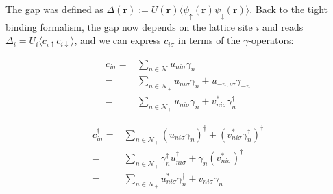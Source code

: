 \documentclass[../main.tex]{subfile}
\begin{document}
The gap was defined as $\Delta(\bm{r}) := U(\bm{r}) \langle \psi_{\uparrow}(\bm{r})\psi_{\downarrow}(\bm{r})\rangle$. Back to the tight binding formalism,
the gap now depends on the lattice site $i$ and reads
$\Delta_i = U_i\langle c_{i\uparrow}c_{i\downarrow}\rangle$, and we can express $c_{i\sigma}$ in terms of the $\gamma$-operators:\\
\begin{center}
\begin{minipage}{0.4\textwidth}
\begin{equation}
    \begin{aligned}\label{eq:BdG_transf_c}
    c_{i\sigma} =& \sum_{n\in\mathcal{N}} u_{ni\sigma}\gamma_n \\
        =& \sum_{n\in\mathcal{N}_+} u_{ni\sigma}\gamma_n + u_{-n,i\sigma}\gamma_{-n}\\
        =& \sum_{n\in\mathcal{N}_+} u_{ni\sigma}\gamma_n + v_{ni\sigma}^{\ast}\gamma_{n}^{\dagger}
    \end{aligned}
\end{equation}
\end{minipage}\hspace{0.05\textwidth}
\begin{minipage}{0.03\textwidth}
\end{minipage}
\begin{minipage}{0.45\textwidth}
    \begin{equation}
        \begin{aligned}\label{eq:BdG_transf_c_dagg}
        c_{i\sigma}^{\dagger} =& \sum_{n\in\mathcal{N}_+}( u_{ni\sigma}\gamma_n)^{\dagger} +( v_{ni\sigma}^{\ast}\gamma_{n}^{\dagger})^{\dagger} \\
            =& \sum_{n\in\mathcal{N}_+} \gamma_n^{\dagger}u_{ni\sigma}^{\dagger} + \gamma_{n}(v_{ni\sigma}^{\ast})^{\dagger} \\
            =& \sum_{n\in\mathcal{N}_+} u_{ni\sigma}^{\ast}\gamma_n^{\dagger} + v_{ni\sigma}\gamma_{n} \\
        \end{aligned}
    \end{equation}
\end{minipage}
\end{center}
\end{document}

